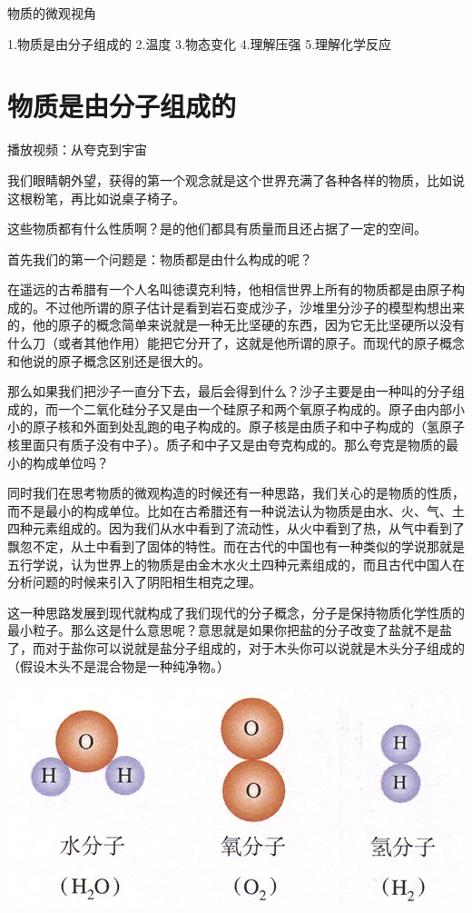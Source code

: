 \documentclass[12pt]{exam}
\newcommand{\keti}{物质的微观视角}
\newcommand{\zhongdian}{1.物质是由分子组成的  2.温度 3.物态变化  4.理解压强 5.理解化学反应   }
\begin{document}
\vspace*{80pt}
\keti \par
\zhongdian \par
\section{物质是由分子组成的}
播放视频：从夸克到宇宙

我们眼睛朝外望，获得的第一个观念就是这个世界充满了各种各样的物质，比如说这根粉笔，再比如说桌子椅子。

这些物质都有什么性质啊？是的他们都具有质量而且还占据了一定的空间。

首先我们的第一个问题是：物质都是由什么构成的呢？

在遥远的古希腊有一个人名叫徳谟克利特，他相信世界上所有的物质都是由原子构成的。不过他所谓的原子估计是看到岩石变成沙子，沙堆里分沙子的模型构想出来的，他的原子的概念简单来说就是一种无比坚硬的东西，因为它无比坚硬所以没有什么刀（或者其他作用）能把它分开了，这就是他所谓的原子。而现代的原子概念和他说的原子概念区别还是很大的。

那么如果我们把沙子一直分下去，最后会得到什么？沙子主要是由一种叫的分子组成的，而一个二氧化硅分子又是由一个硅原子和两个氧原子构成的。原子由内部小小的原子核和外面到处乱跑的电子构成的。原子核是由质子和中子构成的（氢原子核里面只有质子没有中子）。质子和中子又是由夸克构成的。那么夸克是物质的最小的构成单位吗？

同时我们在思考物质的微观构造的时候还有一种思路，我们关心的是物质的性质，而不是最小的构成单位。比如在古希腊还有一种说法认为物质是由水、火、气、土四种元素组成的。因为我们从水中看到了流动性，从火中看到了热，从气中看到了飘忽不定，从土中看到了固体的特性。而在古代的中国也有一种类似的学说那就是五行学说，认为世界上的物质是由金木水火土四种元素组成的，而且古代中国人在分析问题的时候来引入了阴阳相生相克之理。

这一种思路发展到现代就构成了我们现代的分子概念，分子是保持物质化学性质的最小粒子。那么这是什么意思呢？意思就是如果你把盐的分子改变了盐就不是盐了，而对于盐你可以说就是盐分子组成的，对于木头你可以说就是木头分子组成的（假设木头不是混合物是一种纯净物。）

\includegraphics[width=\linewidth]{figures/氢分子氧分子和水分子.jpg} 
\end{document}
